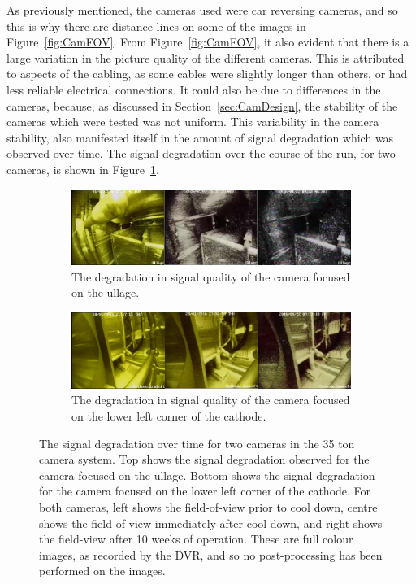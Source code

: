 As previously mentioned, the cameras used were car reversing cameras, and so this is why there are distance lines on some of the images in Figure~\ref{fig:CamFOV}. From Figure~\ref{fig:CamFOV}, it also evident that there is a large variation in the picture quality of the different cameras. This is attributed to aspects of the cabling, as some cables were slightly longer than others, or had less reliable electrical connections. It could also be due to differences in the cameras, because, as discussed in Section~\ref{sec:CamDesign}, the stability of the cameras which were tested was not uniform. This variability in the camera stability, also manifested itself in the amount of signal degradation which was observed over time. The signal degradation over the course of the run, for two cameras, is shown in Figure~\ref{fig:CamSigDeg}. \\

\begin{figure}
  \centering
  \begin{subfigure}{0.95\textwidth}
    \centering
    \includegraphics[width=\textwidth]{Cam1degradation2}
    \caption{The degradation in signal quality of the camera focused on the ullage.}
  \end{subfigure}
  \begin{subfigure}{0.95\textwidth}
    \centering
    \includegraphics[width=\textwidth]{Cam4degradation2}
    \caption{The degradation in signal quality of the camera focused on the lower left corner of the cathode.}
  \end{subfigure}
  \caption[The signal degradation over time for two cameras in the 35 ton camera system]
          {The signal degradation over time for two cameras in the 35 ton camera system. Top shows the signal degradation observed for the camera focused on the ullage. Bottom shows the signal degradation for the camera focused on the lower left corner of the cathode. For both cameras, left shows the field-of-view prior to cool down, centre shows the field-of-view immediately after cool down, and right shows the field-view after 10 weeks of operation. These are full colour images, as recorded by the DVR, and so no post-processing has been performed on the images.}  
  \label{fig:CamSigDeg}
\end{figure}

